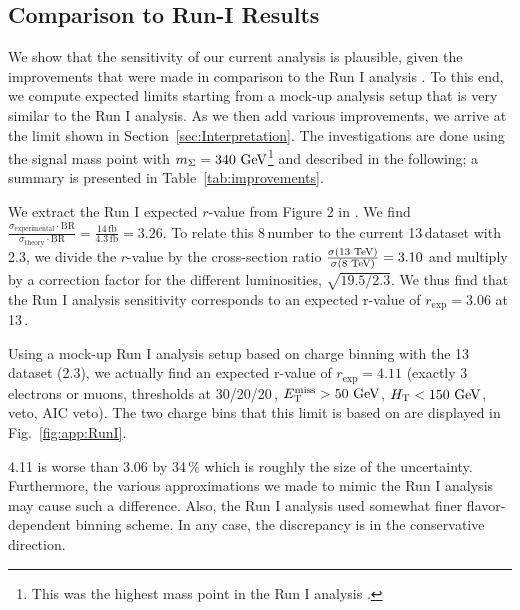 \subsection{Comparison to Run-I Results}
We show that the sensitivity of our current analysis is plausible, given the improvements that were made in comparison to the Run I analysis \cite{CMS-PAS-EXO-14-001}. To this end, we compute expected limits starting from a mock-up analysis setup that is very similar to the Run I analysis. As we then add various improvements, we arrive at the limit shown in Section~\ref{sec:Interpretation}. The investigations are done using the signal mass point with $m_\Sigma = 340\,\,\text{Ge\hspace{-.08em}V}$\footnote{This was the highest mass point in the Run I analysis \cite{CMS-PAS-EXO-14-001}.} and described in the following; a summary is presented in Table~\ref{tab:improvements}.

We extract the Run I expected $r$-value from Figure 2 in \cite{CMS-PAS-EXO-14-001}. We find $\frac{\sigma_\textrm{experimental} \cdot \textrm{BR}}{\sigma_\textrm{theory} \cdot \textrm{BR}} = \frac{14\,\textrm{fb}}{4.3\,\textrm{fb}} = 3.26$. To relate this 8\,\TeV number to the current 13\,\TeV dataset with 2.3\fbinv, we divide the $r$-value by the cross-section ratio $\frac{\sigma(13\,\,\text{Te\hspace{-.08em}V})}{\sigma(8\,\,\text{Te\hspace{-.08em}V})} = 3.10$ and multiply by a correction factor for the different luminosities, $\sqrt{19.5/2.3}$. We thus find that the Run I analysis sensitivity corresponds to an expected r-value of $r_\textrm{exp} = 3.06$ at 13\,\TeV.

Using a mock-up Run I analysis setup based on charge binning with the 13\,\TeV dataset (2.3\fbinv), we actually find an expected r-value of $r_\textrm{exp} = 4.11$ (exactly 3 electrons or muons, \pt thresholds at 30/20/20\,\GeV, $E_{\mathrm{T}}^{\text{miss}} > 50\,\,\text{Ge\hspace{-.08em}V}$, $H_{\mathrm{T}} < 150\,\,\text{Ge\hspace{-.08em}V}$, \Z veto, AIC veto). The two charge bins that this limit is based on are displayed in Fig.~\ref{fig:app:RunI}.

4.11 is worse than 3.06 by 34\,\% which is roughly the size of the uncertainty. Furthermore, the various approximations we made to mimic the Run I analysis may cause such a difference. Also, the Run I analysis used somewhat finer flavor-dependent binning scheme. In any case, the discrepancy is in the conservative direction.

